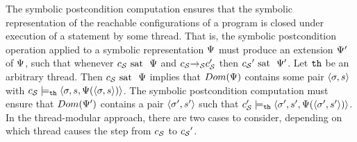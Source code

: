 The symbolic postcondition computation ensures that the symbolic
representation
of the reachable configurations of a program is closed under execution of a
statement by some thread. That is, 
the symbolic postcondition operation applied to a symbolic representation
$\Psi$ must produce an extension $\Psi'$
of $\Psi$, such that whenever $c_{\mathcal S} \mbox{ sat \ } \Psi$
and $c_{\mathcal S}{\xrightarrow{}{}}_{\!\!{\mathcal S}}c_{\mathcal S}'$ then
${c_{\mathcal S}}' \mbox{ sat \ } \Psi'$.
Let ${\tt th}$ be an arbitrary thread. Then $c_{\mathcal S} \mbox{ sat \ } \Psi$
implies that $Dom(\Psi)$ contains some
pair $\left\langle\sigma,s\right\rangle$ with
$c_{\mathcal S} \models_{{\tt th}} \left\langle\sigma,s,\Psi(\left\langle\sigma,s\right\rangle)\right\rangle$.
The symbolic postcondition computation must ensure that
$Dom(\Psi')$ contains a pair
$\left\langle\sigma',s'\right\rangle$ such that
$c_{\mathcal S}' \models_{{\tt th}} \left\langle\sigma',s',\Psi(\left\langle\sigma',s'\right\rangle)\right\rangle$.
In the thread-modular approach, there are two cases to consider, depending
on which thread causes the step from $c_{\mathcal S}$ to ${c_{\mathcal S}}'$.
